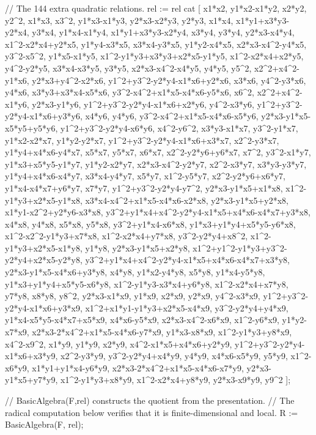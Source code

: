 \documentclass[a4paper]{amsart}
\theoremstyle{definition}
\theoremstyle{remark}
\numberwithin{equation}{section}
\begin{document}
\begin{MagmaCode}
// The 144 extra quadratic relations.
rel := rel cat [
    x1*x2, y1*x2-x1*y2, x2*y2, y2^2, x1*x3, x3^2, y1*x3-x1*y3, y2*x3-x2*y3, y2*y3, x1*x4,
    x1*y1+x3*y3-y2*x4, y3*x4, y1*x4-x1*y4, x1*y1+x3*y3-x2*y4, x3*y4, y3*y4, y2*x3-x4*y4,
    x1^2-x2*x4+y2*x5, y1*y4-x3*x5, x3*x4-y3*x5, y1*y2-x4*x5, x2*x3-x4^2-y4*x5, y3^2-x5^2,
    y1*x5-x1*y5, x1^2-y1*y3+x3*y3+x2*x5-y1*y5, x1^2-x2*x4+x2*y5, y4^2-y2*y5, x3*x4-x3*y5, y3*y5,
    x2*x3-x4^2-x4*y5, y4*y5, y5^2, x2^2+x4^2-y1*x6, y2*x3+y4^2-x2*x6,
    y1^2+y3^2-y2*y4-x1*x6+y2*x6, x3*x6, y4^2-y3*x6, y4*x6, x3*y3+x3*x4-x5*x6,
    y3^2-x4^2+x1*x5-x4*x6-y5*x6, x6^2, x2^2+x4^2-x1*y6, y2*x3-y1*y6,
    y1^2+y3^2-y2*y4-x1*x6+x2*y6, y4^2-x3*y6, y1^2+y3^2-y2*y4-x1*x6+y3*y6, x4*y6, y4*y6,
    y3^2-x4^2+x1*x5-x4*x6-x5*y6, y2*x3-y1*x5-x5*y5+y5*y6, y1^2+y3^2-y2*y4-x6*y6, x4^2-y6^2,
    x3*y3-x1*x7, y3^2-y1*x7, y1*x2-x2*x7, y1*y2-y2*x7, y1^2+y3^2-y2*y4-x1*x6+x3*x7, x2^2-y3*x7,
    y1*y4+x4*x6-y4*x7, x5*x7, y5*x7, x6*x7, x2^2-y2*y6+y6*x7, x7^2, y3^2-x1*y7,
    y1*x3+x5*y5-y1*y7, y1*y2-x2*y7, x2*x3-x4^2-y2*y7, x2^2-x3*y7, x3*y3-y3*y7,
    y1*y4+x4*x6-x4*y7, x3*x4-y4*y7, x5*y7, x1^2-y5*y7, x2^2-y2*y6+x6*y7, y1*x4-x4*x7+y6*y7,
    x7*y7, y1^2+y3^2-y2*y4-y7^2, y2*x3-y1*x5+x1*x8, x1^2-y1*y3+x2*x5-y1*x8,
    x3*x4-x4^2+x1*x5-x4*x6-x2*x8, y2*x3-y1*x5+y2*x8, x1*y1-x2^2+y2*y6-x3*x8,
    y3^2+y1*x4+x4^2-y2*y4-x1*x5+x4*x6-x4*x7+y3*x8, x4*x8, y4*x8, x5*x8, y5*x8, y3^2+y1*x4-x6*x8,
    y1*x3+y1*y4+x5*y5-y6*x8, x1^2-x2^2-y1*y3+x7*x8, x1^2-x2*x4+y7*x8, y3^2-y2*y4+x8^2,
    x1^2-y1*y3+x2*x5-x1*y8, y1*y8, y2*x3-y1*x5+x2*y8, x1^2+y1^2-y1*y3+y3^2-y2*y4+x2*x5-y2*y8,
    y3^2+y1*x4+x4^2-y2*y4-x1*x5+x4*x6-x4*x7+x3*y8, y2*x3-y1*x5-x4*x6+y3*y8, x4*y8, y1*x2-y4*y8,
    x5*y8, y1*x4-y5*y8, y1*x3+y1*y4+x5*y5-x6*y8, x1^2-y1*y3-x3*x4+y6*y8, x1^2-x2*x4+x7*y8,
    y7*y8, x8*y8, y8^2, y2*x3-x1*x9, y1*x9, x2*x9, y2*x9, y4^2-x3*x9,
    y1^2+y3^2-y2*y4-x1*x6+y3*x9, x1^2+x1*y1-y1*y3+x2*x5-x4*x9, y3^2-y2*y4+y4*x9,
    y1*x4-x5*y5-x4*x7+x5*x9, x4*x6-y5*x9, x2*x3-x4^2-x6*x9, x1^2-y6*x9, y1*y2-x7*x9,
    x2*x3-2*x4^2+x1*x5-x4*x6-y7*x9, y1*x3-x8*x9, x1^2-y1*y3+y8*x9, x4^2-x9^2, x1*y9, y1*y9,
    x2*y9, x4^2-x1*x5+x4*x6+y2*y9, y1^2+y3^2-y2*y4-x1*x6+x3*y9, x2^2-y3*y9, y3^2-y2*y4+x4*y9,
    y4*y9, x4*x6-x5*y9, y5*y9, x1^2-x6*y9, x1*y1+y1*x4-y6*y9, x2*x3-2*x4^2+x1*x5-x4*x6-x7*y9,
    y2*x3-y1*x5+y7*y9, x1^2-y1*y3+x8*y9, x1^2-x2*x4+y8*y9, y2*x3-x9*y9, y9^2
];

// BasicAlgebra(F,rel) constructs the quotient from the presentation.
// The radical computation below verifies that it is finite-dimensional and local.
R := BasicAlgebra(F, rel);


\end{MagmaCode}
\end{document}
